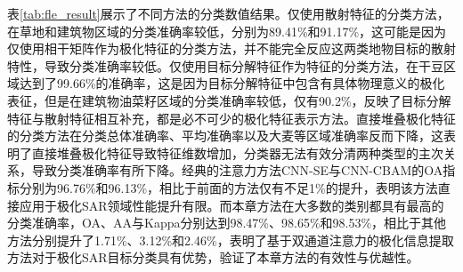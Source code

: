 表\ref{tab:fle_result}展示了不同方法的分类数值结果。仅使用散射特征的分类方法，在草地和建筑物区域的分类准确率较低，分别为89.41\%和91.17\%，这可能是因为仅使用相干矩阵作为极化特征的分类方法，并不能完全反应这两类地物目标的散射特性，导致分类准确率较低。仅使用目标分解特征作为特征的分类方法，在干豆区域达到了99.66\%的准确率，这是因为目标分解特征中包含有具体物理意义的极化表征，但是在建筑物油菜籽区域的分类准确率较低，仅有90.2\%，反映了目标分解特征与散射特征相互补充，都是必不可少的极化特征表示方法。直接堆叠极化特征的分类方法在分类总体准确率、平均准确率以及大麦等区域准确率反而下降，这表明了直接堆叠极化特征导致特征维数增加，分类器无法有效分清两种类型的主次关系，导致分类准确率有所下降。经典的注意力方法CNN-SE与CNN-CBAM的OA指标分别为96.76\%和96.13\%，相比于前面的方法仅有不足1\%的提升，表明该方法直接应用于极化SAR领域性能提升有限。而本章方法在大多数的类别都具有最高的分类准确率，OA、AA与Kappa分别达到98.47\%、98.65\%和98.53\%，相比于其他方法分别提升了1.71\%、3.12\%和2.46\%，表明了基于双通道注意力的极化信息提取方法对于极化SAR目标分类具有优势，验证了本章方法的有效性与优越性。

